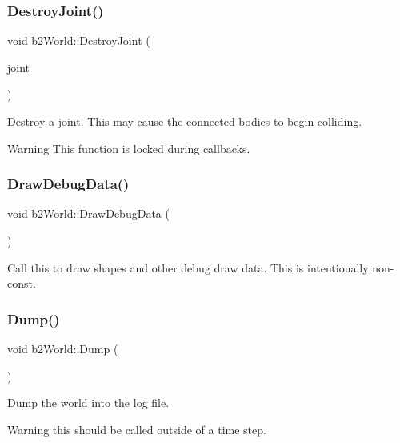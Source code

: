 \subsubsection{\texorpdfstring{DestroyJoint()}{DestroyJoint()}}
{\footnotesize\ttfamily void b2\+World\+::\+Destroy\+Joint (\begin{DoxyParamCaption}\item[{\mbox{\hyperlink{classb2_joint}{b2\+Joint}} $\ast$}]{joint }\end{DoxyParamCaption})}

Destroy a joint. This may cause the connected bodies to begin colliding. \begin{DoxyWarning}{Warning}
This function is locked during callbacks. 
\end{DoxyWarning}
\mbox{\label{classb2_world_a293d9865e407fd463e168b0a29856acc}} 
\subsubsection{\texorpdfstring{DrawDebugData()}{DrawDebugData()}}
{\footnotesize\ttfamily void b2\+World\+::\+Draw\+Debug\+Data (\begin{DoxyParamCaption}{ }\end{DoxyParamCaption})}



Call this to draw shapes and other debug draw data. This is intentionally non-\/const. 

\mbox{\label{classb2_world_a73c1fec260d460514edd335d4c235893}} 
\subsubsection{\texorpdfstring{Dump()}{Dump()}}
{\footnotesize\ttfamily void b2\+World\+::\+Dump (\begin{DoxyParamCaption}{ }\end{DoxyParamCaption})}

Dump the world into the log file. \begin{DoxyWarning}{Warning}
this should be called outside of a time step. 
\end{DoxyWarning}
\mbox{\label{classb2_world_a3d7ce9b87a54fb4f84433f6223d81175}} 
